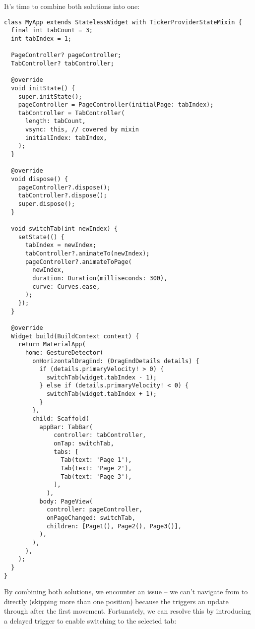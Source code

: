 \noindent It's time to combine both solutions into one:

\begin{lstlisting}
class MyApp extends StatelessWidget with TickerProviderStateMixin {
  final int tabCount = 3;
  int tabIndex = 1;

  PageController? pageController;
  TabController? tabController;

  @override
  void initState() {
    super.initState();
    pageController = PageController(initialPage: tabIndex);
    tabController = TabController(
      length: tabCount,
      vsync: this, // covered by mixin
      initialIndex: tabIndex,
    );
  }

  @override
  void dispose() {
    pageController?.dispose();
    tabController?.dispose();
    super.dispose();
  }

  void switchTab(int newIndex) {
    setState(() {
      tabIndex = newIndex;
      tabController?.animateTo(newIndex);
      pageController?.animateToPage(
        newIndex,
        duration: Duration(milliseconds: 300),
        curve: Curves.ease,
      );
    });
  }

  @override
  Widget build(BuildContext context) {
    return MaterialApp(
      home: GestureDetector(
        onHorizontalDragEnd: (DragEndDetails details) {
          if (details.primaryVelocity! > 0) {
            switchTab(widget.tabIndex - 1);
          } else if (details.primaryVelocity! < 0) {
            switchTab(widget.tabIndex + 1);
          }
        },
        child: Scaffold(
          appBar: TabBar(
              controller: tabController,
              onTap: switchTab,
              tabs: [
                Tab(text: 'Page 1'),
                Tab(text: 'Page 2'),
                Tab(text: 'Page 3'),
              ],
            ),
          body: PageView(
            controller: pageController,
            onPageChanged: switchTab,
            children: [Page1(), Page2(), Page3()],
          ),
        ),
      ),
    );
  }
}
\end{lstlisting}

\noindent By combining both solutions, we encounter an issue -- we can't navigate from  to  directly 
(skipping more than one position) because the  triggers an update through  after the 
first movement. Fortunately, we can resolve this by introducing a delayed trigger to enable switching to the selected 
tab:

